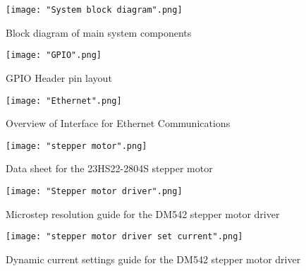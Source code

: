 \pagebreak[4]

\begin{figure}[h!]
	\centering
	{\texttt{[image: "System block diagram".png]}}
	\caption{Block diagram of main system components}
	\label{fig:BD1}
\end{figure}

\pagebreak[4]

\begin{figure}[h!]
	\centering
	{\texttt{[image: "GPIO".png]}}
	\caption{GPIO Header pin layout}
	\label{fig:GPIO}
\end{figure}


\pagebreak[4]

\begin{figure}[h!]
	\centering
	{\texttt{[image: "Ethernet".png]}}
	\caption{Overview of Interface for Ethernet Communications}
	\label{fig:Ether}
\end{figure}

\pagebreak[4]


\begin{figure}[h!]
	\centering
	{\texttt{[image: "stepper motor".png]}}
	\caption{Data sheet for the 23HS22-2804S stepper motor}
	\label{fig:SM}
\end{figure}

\pagebreak[4]

\begin{figure}[h!]
	\centering
	{\texttt{[image: "Stepper motor driver".png]}}
	\caption{Microstep resolution guide for the DM542 stepper motor driver}
	\label{fig:SMD1}
\end{figure}

\pagebreak[4]

\begin{figure}[h!]
	\centering
	{\texttt{[image: "stepper motor driver set current".png]}}
	\caption{Dynamic current settings guide for the DM542 stepper motor driver}
	\label{fig:SMD2}
\end{figure}

\pagebreak[4]

